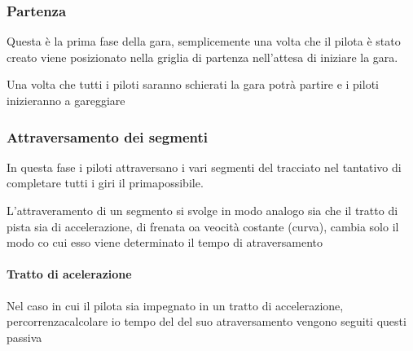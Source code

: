 \documentclass[a4paper,11pt, twoside]{book}
\begin{document}
	\subsubsection{Partenza}
	  Questa è la prima fase della gara, semplicemente una volta che il pilota è stato creato
	  viene posizionato nella griglia di partenza nell'attesa di iniziare la gara.
	  
	  Una volta che tutti i piloti saranno schierati la gara potrà partire e i piloti inizieranno a gareggiare
	  
	\subsubsection{Attraversamento dei segmenti}
	\label{AttraversamentoSegmenti}
	  In questa fase i piloti attraversano i vari segmenti del tracciato nel tantativo di completare tutti i giri
	  il primapossibile.
	  
	  L'attraveramento di un segmento si svolge in modo analogo sia che il tratto di pista sia
	  di accelerazione, di frenata oa veocità costante (curva), cambia solo il modo co cui esso viene 
	  determinato il tempo di atraversamento
	  
	  \paragraph{Tratto di acelerazione\\}
	    Nel caso in cui il pilota sia impegnato in un tratto di accelerazione, percorrenzacalcolare io tempo del
	    del suo atraversamento vengono seguiti questi passiva
	    
\end{document}

